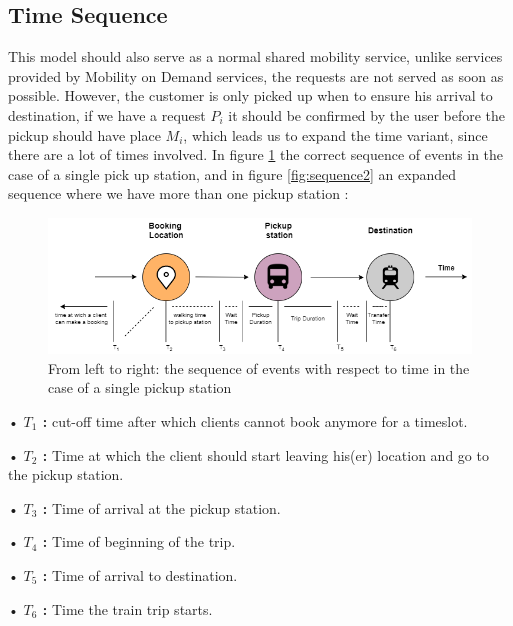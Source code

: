\documentclass{article}
\begin{document}
\subsection{Time Sequence}
\label{subsec:timeseq}
This model should also serve as a normal shared mobility service, unlike services provided by Mobility on Demand services, the requests are not served as soon as possible. However, the customer is only picked up when to ensure his arrival to destination, 
if we have a request $P_i$  it should be confirmed by the user before the pickup should have place $M_i$, which leads us to expand the time variant, since there are a lot of times involved. In figure \ref{fig:sequence} the correct sequence of events in the case of a single pick up station, and in figure \ref{fig:sequence2} an expanded sequence where we have more than one pickup station :

\begin{figure}[H]
    \centering 
  \includegraphics[width=\linewidth]{pictures/Time_sequence}
  \caption{From left to right: the sequence of events with respect to time in the case of a single pickup station}
\label{fig:sequence}
\end{figure}

\begin{list}{}
\item • \textbf{$T_{1}$ :} cut-off time after which clients cannot book anymore for a timeslot.
\item • \textbf{$T_{2}$ :} Time at which the client should start leaving his(er) location and go to the pickup station.
\item • \textbf{$T_{3}$ :} Time of arrival at the pickup station.
\item • \textbf{$T_{4}$ :} Time of beginning of the trip.
\item • \textbf{$T_{5}$ :} Time of arrival to destination.
\item • \textbf{$T_{6}$ :} Time the train trip starts.
\end{list} 
\end{document}
